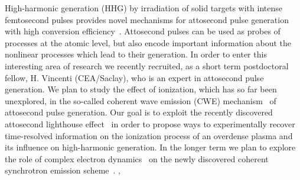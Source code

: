 \documentclass[11pt,a4paper,final]{moderncv}
\begin{document}
High-harmonic generation (HHG) by irradiation of solid targets with intense femtosecond pulses 
provides novel mechanisms for attosecond pulse
generation with high conversion efficiency~\cite{teubner09}. Attosecond pulses can be used as probes of 
processes at the atomic level, but also encode important information
about the nonlinear processes which lead to their generation. 
In order to enter this interesting area of research we recently recruited, as a short term postdoctoral fellow,
H. Vincenti (CEA/Saclay), who is an expert in
attosecond pulse generation.
We plan to study the effect of ionization, which has so far been unexplored,
in the so-called coherent wave emission (CWE) mechanism~\cite{borot12} of attosecond pulse generation. 
Our goal is to exploit the recently discovered attosecond lighthouse effect~\cite{vincenti12,wheeler12} 
in order to propose ways to experimentally recover time-resolved information 
on the ionization process of an overdense plasma and its influence on high-harmonic generation.
In the longer term we plan to explore the role of complex electron dynamics~\cite{sanz12} on the
newly discovered coherent synchrotron emission scheme~\cite{dromey12}. 
\sep
\end{document}
